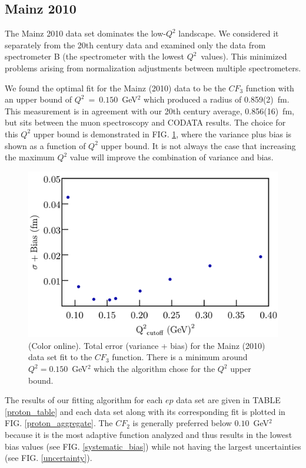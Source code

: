 \documentclass[aps,prd,twocolumn,groupedaddress,10pt]{revtex4-1}
\begin{document}
\subsection{Mainz 2010}

The Mainz 2010 \cite{Mainz2010} data set dominates the low-$Q^2$ landscape. We considered it separately from the 20th century data and examined only the data from spectrometer B (the spectrometer with the lowest $Q^2$~values). This minimized problems arising from normalization adjustments between multiple spectrometers. 

We found the optimal fit for the Mainz (2010) data to be the ${CF}_3$ function with an upper bound of $Q^2~=~0.150$~GeV$^2$ which produced a radius of 0.859(2)~fm. This measurement is in agreement with our 20th century average, 0.856(16)~fm, but sits between the muon spectroscopy and CODATA results. The choice for this $Q^2$ upper bound is demonstrated in FIG. \ref{sum_error}, where the variance plus bias is shown as a function of $Q^2$ upper bound. It is not always the case that increasing the maximum $Q^2$ value will improve the combination of variance and bias.

\begin{figure}[t]
\includegraphics[scale=0.39]{sum_error.pdf}
\caption{(Color online). Total error (variance + bias) for the Mainz (2010) data set fit to the ${CF}_3$ function. There is a minimum around $Q^2 = 0.150$~GeV$^2$ which the algorithm chose for the $Q^2$ upper bound.}
\label{sum_error}
\end{figure}

The results of our fitting algorithm for each $ep$ data set are given in TABLE \ref{proton_table} and each data set along with its corresponding fit is plotted in FIG. \ref{proton_aggregate}. The $CF_2$ is generally preferred below $0.10$~GeV$^2$ because it is the most adaptive function analyzed and thus results in the lowest bias values (see FIG. \ref{systematic_bias}) while not having the largest uncertainties (see FIG. \ref{uncertainty}). 
\end{document}
